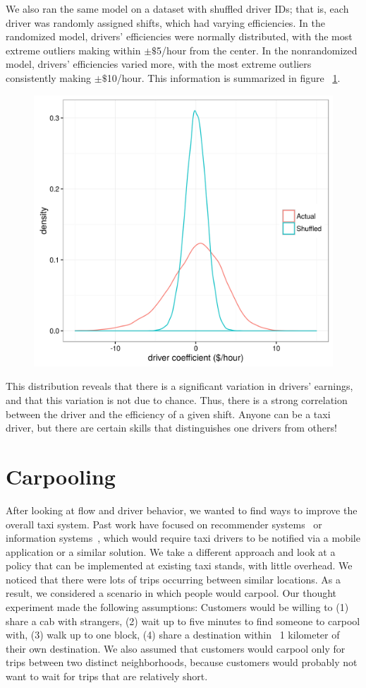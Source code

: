 \documentclass[twocolumn]{article}
\begin{document}
We also ran the same model on a dataset with shuffled driver IDs; that is, each driver was randomly assigned shifts, which had varying efficiencies. In the randomized model, drivers' efficiencies were normally distributed, with the most extreme outliers making within $\pm$$\$$5/hour from the center. In the nonrandomized model, drivers' efficiencies varied more, with the most extreme outliers consistently making $\pm$$\$$10/hour. This information is summarized in figure ~\ref{fig:efficiency}.
\begin{figure}[h]
  \centering
  \includegraphics[width=.9\linewidth]{efficiency}
  \label{fig:efficiency}
  
\end{figure}
This distribution reveals that there is a significant variation in drivers’ earnings, and that this variation is not due to chance. Thus, there is a strong correlation between the driver and the efficiency of a given shift. Anyone can be a taxi driver, but there are certain skills that distinguishes one drivers from others! 
\section{Carpooling}
After looking at flow and driver behavior, we wanted to find ways to improve the overall taxi system. Past work have focused on recommender systems~\cite{ZHAN:2014} or information systems~\cite{KIM:2005}, which would require taxi drivers to be notified via a mobile application or a similar solution. We take a different approach and look at a policy that can be implemented at existing taxi stands, with little overhead. We noticed that there were lots of trips occurring between similar locations. As a result, we considered a scenario in which people would carpool. Our thought experiment made the following assumptions: Customers would be willing to (1) share a cab with strangers, (2) wait up to five minutes to find someone to carpool with, (3) walk up to one block, (4) share a destination within ~1 kilometer of their own destination. We also assumed that customers would carpool only for trips between two distinct neighborhoods, because customers would probably not want to wait for trips that are relatively short.
\end{document}
